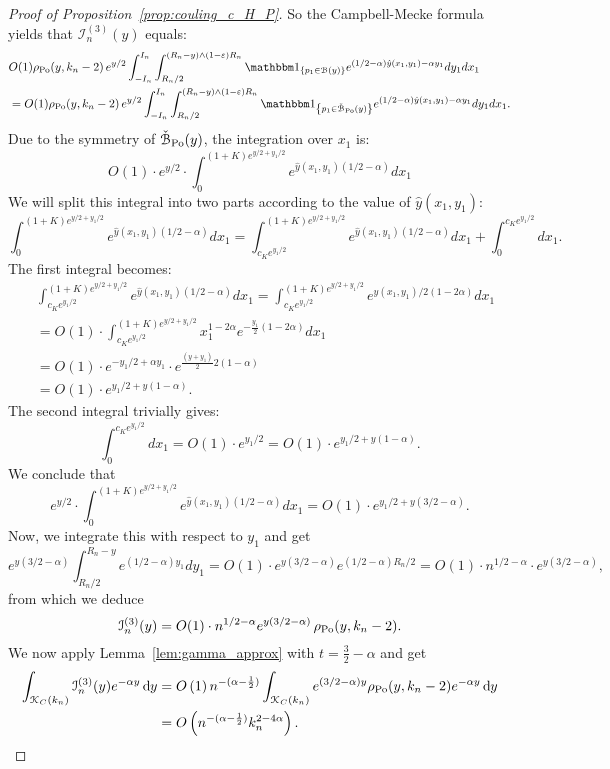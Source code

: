 \begin{proof}[Proof of Proposition~\ref{prop:couling_c_H_P}]
So the Campbell-Mecke formula yields that $\mathcal{I}_n^{(3)}(y)$ equals: 
\begin{align*}
 	&O(1) \rho_{\Po}(y,k_n-2) \, e^{y/2} \int_{-I_n}^{I_n} \int_{R_n/2}^{(R_n - y) \wedge (1-\eps)R_n}  
		\ind{p_1 \in \BallHyp{y}} e^{(1/2 -\alpha) \hat{y}(x_1,y_1) - \alpha y_1} dy_1dx_1 \\
	&= O(1) \rho_{\Po}(y,k_n-2) \, e^{y/2} \int_{-I_n}^{I_n} \int_{R_n/2}^{(R_n - y) \wedge (1-\eps)R_n}  
		\ind{p_1 \in \FatBallHyp{y}} e^{(1/2 -\alpha) \hat{y}(x_1,y_1) - \alpha y_1} dy_1dx_1.
\end{align*}
Due to the symmetry of $\check{{\mathcal B}}_{{\mathrm{Po}}}(y)$, the integration over $x_1$ is: 
\[
	O(1) \cdot e^{y/2} \cdot \int_0^{(1+K)e^{y/2 + y_1/2}} e^{\hat{y}(x_1,y_1) (1/2 -\alpha)} dx_1
\]
We will split this integral into two parts according to the value of $\hat{y}(x_1,y_1)$:
\[
\int_0^{(1+K) e^{y/2 + y_1/2}} e^{\hat{y}(x_1,y_1) (1/2 -\alpha)} dx_1 = 
\int_{c_K e^{y_1/2}}^{(1+K)e^{y/2 + y_1/2}} e^{\hat{y}(x_1,y_1) (1/2 -\alpha)} dx_1 + \int_0^{c_K e^{y_1/2}} dx_1.
\]
The first integral becomes: 
\begin{align*}
&\int_{c_K e^{y_1/2}}^{(1+K)e^{y/2 + y_1/2}} e^{\hat{y}(x_1,y_1) (1/2 -\alpha)} dx_1  = 
\int_{c_K e^{y_1/2}}^{(1+K)e^{y/2 + y_1/2}} e^{\hat{y}(x_1,y_1)/2 (1 -2\alpha)} dx_1  \\
&= O(1)\cdot \int_{c_K e^{y_1/2}}^{(1+K)e^{y/2 + y_1/2}} x_1^{1 -2\alpha} 
e^{-\frac{y_1}{2} (1-2\alpha)} dx_1 \\
&= O(1) \cdot e^{-y_1/2 + \alpha y_1} \cdot e^{\frac{(y+y_1)}{2} 2(1-\alpha)} \\
&=O(1) \cdot e^{y_1/2 +y(1-\alpha)}.  
\end{align*}
The second integral trivially gives: 
\[
	\int_0^{c_K e^{y_1/2}} dx_1 = O(1) \cdot e^{y_1/2} = O(1) \cdot e^{y_1/2 +y(1-\alpha)}.
\]
We conclude that 
\[
	e^{y/2} \cdot \int_0^{(1+K)e^{y/2 + y_1/2}} e^{\hat{y}(x_1,y_1) (1/2 -\alpha)} dx_1 = 
	O(1) \cdot e^{y_1/2 +y(3/2-\alpha)}.
\]
Now, we integrate this with respect to $y_1$ and get 
\[
	e^{y(3/2 -\alpha)} \int_{R_n/2}^{R_n-y} e^{(1/2-\alpha)y_1} dy_1 =  O(1) \cdot e^{y(3/2 -\alpha)} 
	e^{(1/2 -\alpha) R_n/2} = O(1) \cdot n^{1/2 -\alpha} \cdot e^{y(3/2 - \alpha)},
\]
from which we deduce
\begin{equation} \label{eq:term3_intermediate}
	\mathcal{I}_n^{(3)}(y) = 
	O(1) \cdot n^{1/2 -\alpha} e^{y(3/2 - \alpha)} \, \rho_{{\mathrm{Po}}}(y,k_n-2). 
\end{equation}
We now apply Lemma~\ref{lem:gamma_approx} with $t = \frac{3}{2} - \alpha$ and get 
\begin{align*}
	\int_{{\mathcal K}_{C}(k_n)} \mathcal{I}_n^{(3)}(y) e^{-\alpha y} \operatorname{\mathrm{d}\hspace{-2pt}} y
	&= O\left(1\right) n^{-(\alpha - \frac{1}{2})} \int_{{\mathcal K}_{C}(k_n)} e^{(3/2 - \alpha)y} \rho_{{\mathrm{Po}}}(y,k_n-2) e^{-\alpha y} 
		\operatorname{\mathrm{d}\hspace{-2pt}} y\\
	&= O\left(n^{-(\alpha - \frac{1}{2})} k_n^{2 -4\alpha}\right).
\end{align*}


\end{proof}
